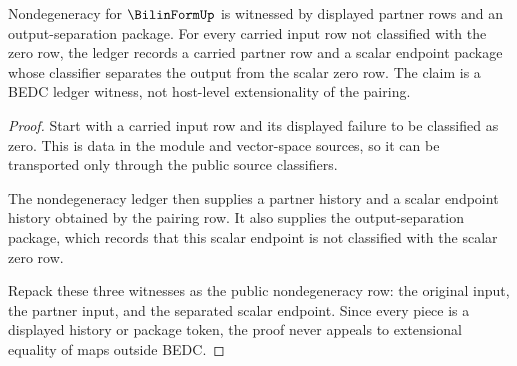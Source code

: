 \begin{theorem}
\label{thm:bilinform-nondegeneracy-witness-ledger-row}
Nondegeneracy for $\BilinFormUp$ is witnessed by displayed partner rows and an
output-separation package. For every carried input row not classified with
the zero row, the ledger records a carried partner row and a scalar endpoint
package whose classifier separates the output from the scalar zero row. The
claim is a BEDC ledger witness, not host-level extensionality of the pairing.
\end{theorem}
\begin{proof}
Start with a carried input row and its displayed failure to be classified as
zero. This is data in the module and vector-space sources, so it can be
transported only through the public source classifiers.

The nondegeneracy ledger then supplies a partner history and a scalar endpoint
history obtained by the pairing row. It also supplies the output-separation
package, which records that this scalar endpoint is not classified with the
scalar zero row.

Repack these three witnesses as the public nondegeneracy row: the original
input, the partner input, and the separated scalar endpoint. Since every
piece is a displayed history or package token, the proof never appeals to
extensional equality of maps outside BEDC.
\end{proof}

